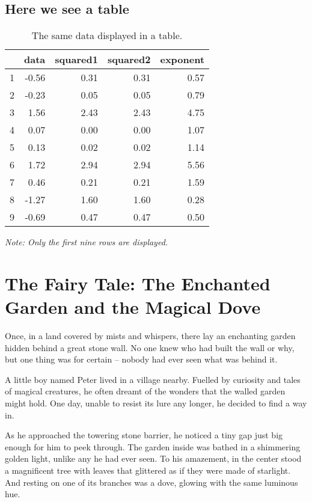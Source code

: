 \documentclass[10pt,fullpage, a4paper, titlepage]{article}
\begin{document}
\subsection{Here we see a table}
\begin{table}[H] %
\centering
\caption{The same data displayed in a table.}
\label{tab:data_summary}
\begin{tabular}{rrrrr}
  \hline
 & data & squared1 & squared2 & exponent \\ 
  \hline
1 & -0.56 & 0.31 & 0.31 & 0.57 \\ 
  2 & -0.23 & 0.05 & 0.05 & 0.79 \\ 
  3 & 1.56 & 2.43 & 2.43 & 4.75 \\ 
  4 & 0.07 & 0.00 & 0.00 & 1.07 \\ 
  5 & 0.13 & 0.02 & 0.02 & 1.14 \\ 
  6 & 1.72 & 2.94 & 2.94 & 5.56 \\ 
  7 & 0.46 & 0.21 & 0.21 & 1.59 \\ 
  8 & -1.27 & 1.60 & 1.60 & 0.28 \\ 
  9 & -0.69 & 0.47 & 0.47 & 0.50 \\ 
   \hline
\end{tabular}
\begin{center}
\textit{Note: Only the first nine rows are displayed.}
\end{center}
\end{table}


\section{The Fairy Tale: The Enchanted Garden and the Magical Dove}

Once, in a land covered by mists and whispers, there lay an enchanting garden hidden behind a great stone wall. No one knew who had built the wall or why, but one thing was for certain – nobody had ever seen what was behind it.

A little boy named Peter lived in a village nearby. Fuelled by curiosity and tales of magical creatures, he often dreamt of the wonders that the walled garden might hold. One day, unable to resist its lure any longer, he decided to find a way in.

As he approached the towering stone barrier, he noticed a tiny gap just big enough for him to peek through. The garden inside was bathed in a shimmering golden light, unlike any he had ever seen. To his amazement, in the center stood a magnificent tree with leaves that glittered as if they were made of starlight. And resting on one of its branches was a dove, glowing with the same luminous hue.
\end{document}
